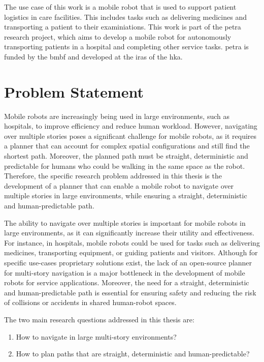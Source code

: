 The use case of this work is a mobile robot that is used to support patient logistics in care facilities. This includes tasks such as delivering medicines and transporting a patient to their examiniations. This work is part of the \gls{petra} research project, which aims to develop a mobile robot for autonomously transporting patients in a hospital and completing other service tasks. \gls{petra} is funded by the \gls{bmbf} and developed at the \gls{iras} of the \gls{hka}.


\section{Problem Statement}
\label{sec:problem_statement}
Mobile robots are increasingly being used in large environments, such as hospitals, to improve efficiency and reduce human workload. However, navigating over multiple stories poses a significant challenge for mobile robots, as it requires a planner that can account for complex spatial configurations and still find the shortest path. Moreover, the planned path must be straight, deterministic and predictable for humans who could be walking in the same space as the robot. Therefore, the specific research problem addressed in this thesis is the development of a planner that can enable a mobile robot to navigate over multiple stories in large environments, while ensuring a straight, deterministic and human-predictable path. 

The ability to navigate over multiple stories is important for mobile robots in large environments, as it can significantly increase their utility and effectiveness. For instance, in hospitals, mobile robots could be used for tasks such as delivering medicines, transporting equipment, or guiding patients and visitors. Although for specific use-cases proprietary solutions exist, the lack of an open-source planner for multi-story navigation is a major bottleneck in the development of mobile robots for service applications. Moreover, the need for a straight, deterministic and human-predictable path is essential for ensuring safety and reducing the risk of collisions or accidents in shared human-robot spaces.

The two main research questions addressed in this thesis are:
\begin{enumerate}
    \item How to navigate in large multi-story environments?
    \item How to plan paths that are straight, deterministic and human-predictable?
\end{enumerate}

